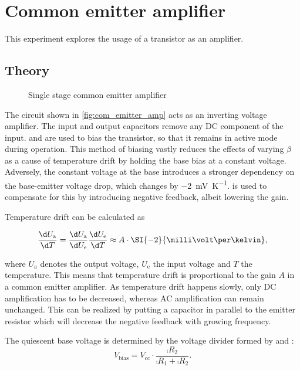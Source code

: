 \chapter{Common emitter amplifier}
This experiment explores the usage of a transistor as an amplifier.

\section{Theory}\label{sec:theory}
\begin{figure}[tbp]
	\centering
	\caption[Single Stage Common Emitter Amplifier]{Single stage common emitter amplifier}
	\label{fig:com_emitter_amp}
\end{figure}
The circuit shown in \autoref{fig:com_emitter_amp} acts as an inverting voltage amplifier.
The input and output capacitors remove any DC component of the input.
 and  are used to bias the transistor, so that it remains in active mode during operation.
This method of biasing vastly reduces the effects of varying $\beta$ as a cause of temperature drift by holding the base bias at a constant voltage.
Adversely, the constant voltage at the base introduces a stronger dependency on the base-emitter voltage drop, which changes by \SI{-2}{\milli\volt\per\kelvin}.
 is used to compensate for this by introducing negative feedback, albeit lowering the gain.

Temperature drift can be calculated as

\begin{equation}
	\frac{\d U_\text{a}}{\d T}=\frac{\d U_\text{a}}{\d U_\text{e}}\frac{\d U_\text{e}}{\d T}\approx A\cdot\SI{-2}{\milli\volt\per\kelvin},
\end{equation}

where $U_\text{a}$ denotes the output voltage, $U_\text{e}$ the input voltage and $T$ the temperature.
This means that temperature drift is proportional to the gain $A$ in a common emitter amplifier.
As temperature drift happens slowly, only DC amplification has to be decreased, whereas AC amplification can remain unchanged.
This can be realized by putting a capacitor  in parallel to the emitter resistor  which will decrease the negative feedback with growing frequency.

The quiescent base voltage is determined by the voltage divider formed by  and :
\begin{equation}\label{eq:bias_volt}
	V_\text{bias}=V_\text{cc}\cdot\frac{\comp{R_2}}{\comp{R_1}+\comp{R_2}}.
\end{equation}

